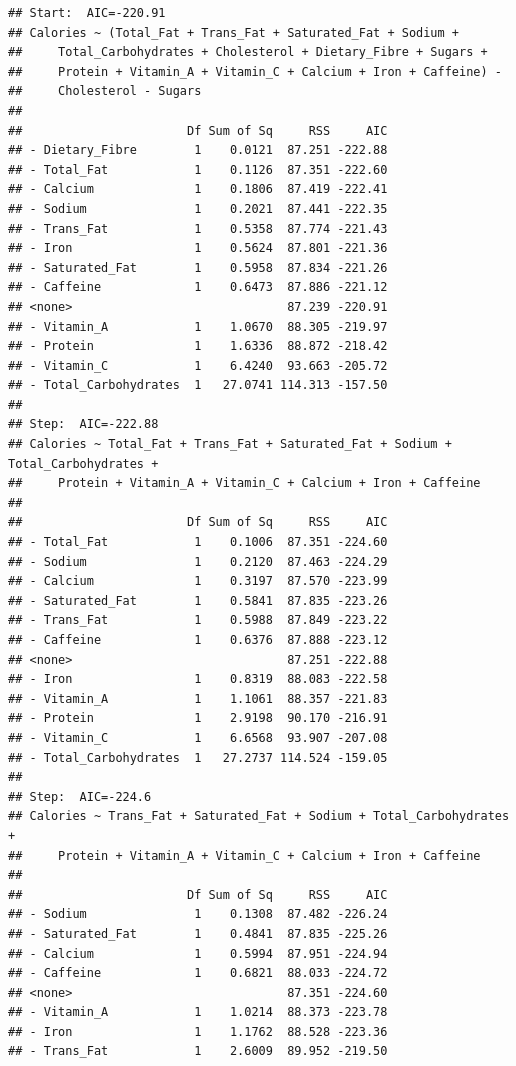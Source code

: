 \documentclass[
]{article}
\begin{document}
\begin{verbatim}
## Start:  AIC=-220.91
## Calories ~ (Total_Fat + Trans_Fat + Saturated_Fat + Sodium + 
##     Total_Carbohydrates + Cholesterol + Dietary_Fibre + Sugars + 
##     Protein + Vitamin_A + Vitamin_C + Calcium + Iron + Caffeine) - 
##     Cholesterol - Sugars
## 
##                       Df Sum of Sq     RSS     AIC
## - Dietary_Fibre        1    0.0121  87.251 -222.88
## - Total_Fat            1    0.1126  87.351 -222.60
## - Calcium              1    0.1806  87.419 -222.41
## - Sodium               1    0.2021  87.441 -222.35
## - Trans_Fat            1    0.5358  87.774 -221.43
## - Iron                 1    0.5624  87.801 -221.36
## - Saturated_Fat        1    0.5958  87.834 -221.26
## - Caffeine             1    0.6473  87.886 -221.12
## <none>                              87.239 -220.91
## - Vitamin_A            1    1.0670  88.305 -219.97
## - Protein              1    1.6336  88.872 -218.42
## - Vitamin_C            1    6.4240  93.663 -205.72
## - Total_Carbohydrates  1   27.0741 114.313 -157.50
## 
## Step:  AIC=-222.88
## Calories ~ Total_Fat + Trans_Fat + Saturated_Fat + Sodium + Total_Carbohydrates + 
##     Protein + Vitamin_A + Vitamin_C + Calcium + Iron + Caffeine
## 
##                       Df Sum of Sq     RSS     AIC
## - Total_Fat            1    0.1006  87.351 -224.60
## - Sodium               1    0.2120  87.463 -224.29
## - Calcium              1    0.3197  87.570 -223.99
## - Saturated_Fat        1    0.5841  87.835 -223.26
## - Trans_Fat            1    0.5988  87.849 -223.22
## - Caffeine             1    0.6376  87.888 -223.12
## <none>                              87.251 -222.88
## - Iron                 1    0.8319  88.083 -222.58
## - Vitamin_A            1    1.1061  88.357 -221.83
## - Protein              1    2.9198  90.170 -216.91
## - Vitamin_C            1    6.6568  93.907 -207.08
## - Total_Carbohydrates  1   27.2737 114.524 -159.05
## 
## Step:  AIC=-224.6
## Calories ~ Trans_Fat + Saturated_Fat + Sodium + Total_Carbohydrates + 
##     Protein + Vitamin_A + Vitamin_C + Calcium + Iron + Caffeine
## 
##                       Df Sum of Sq     RSS     AIC
## - Sodium               1    0.1308  87.482 -226.24
## - Saturated_Fat        1    0.4841  87.835 -225.26
## - Calcium              1    0.5994  87.951 -224.94
## - Caffeine             1    0.6821  88.033 -224.72
## <none>                              87.351 -224.60
## - Vitamin_A            1    1.0214  88.373 -223.78
## - Iron                 1    1.1762  88.528 -223.36
## - Trans_Fat            1    2.6009  89.952 -219.50

\end{verbatim}
\end{document}
